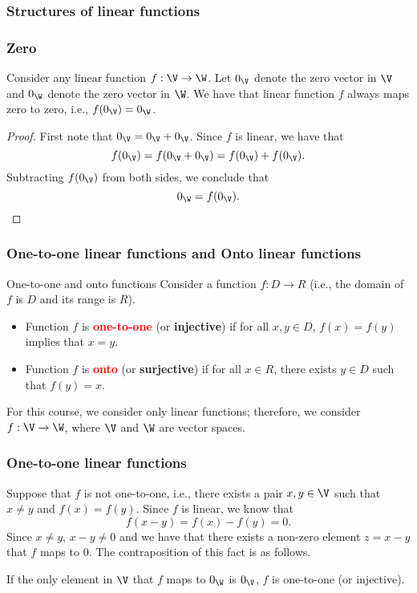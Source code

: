\begin{frame}
  \frametitle{Structures of linear functions}
\end{frame}

\begin{frame}
  \frametitle{Zero}

\begin{lemma}
  Consider any linear function $f:\V\rightarrow\W$.  Let $0_\V$ denote
  the zero vector in $\V$ and $0_\W$ denote the zero vector in $\W$.
  We have that linear function $f$ always maps zero to zero, i.e.,
  $f(0_\V)=0_\W$.
\end{lemma}
\begin{proof}
  First note that $0_\V=0_\V+0_\V$.  Since $f$ is linear, we have that
  \[
  f(0_\V)=f(0_\V+0_\V)=f(0_\V)+f(0_\V).
  \]
  Subtracting $f(0_\V)$ from both sides, we conclude that
  \[
  0_\W=f(0_\V).
  \]
\end{proof}
\end{frame}

\begin{frame}
\frametitle{One-to-one linear functions and Onto linear functions}

\begin{block}{One-to-one and onto functions}
Consider a function $f:D\rightarrow R$ (i.e., the domain of $f$ is $D$
and its range is $R$).

\begin{itemize}
\item
  Function $f$ is \textcolor{red}{\bf one-to-one} (or {\bf injective}) if for all
  $x,y\in D$, $f(x)=f(y)$ implies that $x=y$.
\item
  Function $f$ is \textcolor{red}{\bf onto} (or {\bf surjective}) if for all $x\in
  R$, there exists $y\in D$ such that $f(y)=x$.
\end{itemize}
\end{block}

\vspace{0.2in}

For this course, we consider only linear functions; therefore,
we consider $f:\V\rightarrow\W$, where $\V$ and $\W$ are vector spaces.
\end{frame}

\begin{frame}
\frametitle{One-to-one linear functions}

Suppose that $f$ is not one-to-one, \pause i.e., there exists a pair
$x,y\in\V$ such that $x\neq y$ and $f(x)=f(y)$. \pause Since $f$ is linear,
we know that
\[
f(x-y)=f(x)-f(y)=0.
\]
\pause
Since $x\neq y$, $x-y\neq 0$ and we have that there exists a non-zero
element $z=x-y$ that $f$ maps to $0$.  \pause The contraposition of this fact
is as follows.

If the only element in $\V$ that $f$ maps to $0_\W$ is
$0_\V$, $f$ is one-to-one (or injective).
\end{frame}


